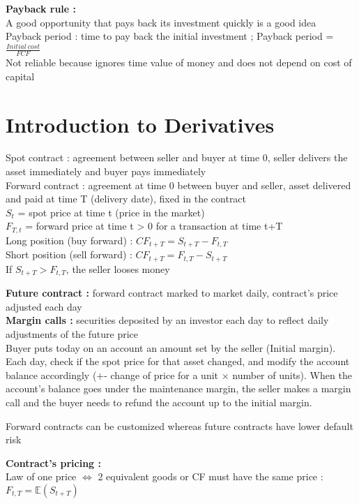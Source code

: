 \documentclass[a4paper,twocolumn]{article}
\begin{document}
\textbf{Payback rule :}\\
A good opportunity that pays back its investment quickly is a good idea\\
Payback period : time to pay back the initial investment ; Payback period = $\frac{Initial\ cost}{FCF}$\\
Not reliable because ignores time value of money and does not depend on cost of capital
\vspace{-0.15cm}
\section*{Introduction to Derivatives}
\vspace{-0.2cm}

Spot contract : agreement between seller and buyer at time 0, seller delivers the asset immediately and buyer pays immediately\\
Forward contract : agreement at time 0 between buyer and seller, asset delivered and paid at time T (delivery date), fixed in the contract\\
$S_t$ = spot price at time t (price in the market)\\
$F_{T,t}$ = forward price at time t > 0 for a transaction at time t+T\\
Long position (buy forward) : $CF_{t+T} = S_{t+T} - F_{t,T}$\\
Short position (sell forward) : $CF_{t+T} = F_{t,T} - S_{t+T}$\\
If $S_{t+T} > F_{t,T}$, the seller looses money

\textbf{Future contract :} forward contract marked to market daily, contract's price adjusted each day\\
\textbf{Margin calls :} securities deposited by an investor each day to reflect daily adjustments of the future price\\
Buyer puts today on an account an amount set by the seller (Initial margin). Each day, check if the spot price for that asset changed, and modify the account balance accordingly (+- change of price for a unit $\times$ number of units). When the account's balance goes under the maintenance margin, the seller makes a margin call and the buyer needs to refund the account up to the initial margin.

Forward contracts can be customized whereas future contracts have lower default risk

\textbf{Contract's pricing :}\\
Law of one price $\Leftrightarrow$ 2 equivalent goods or CF must have the same price : $F_{t,T} = \mathbb{E}(S_{t+T})$
\end{document}
